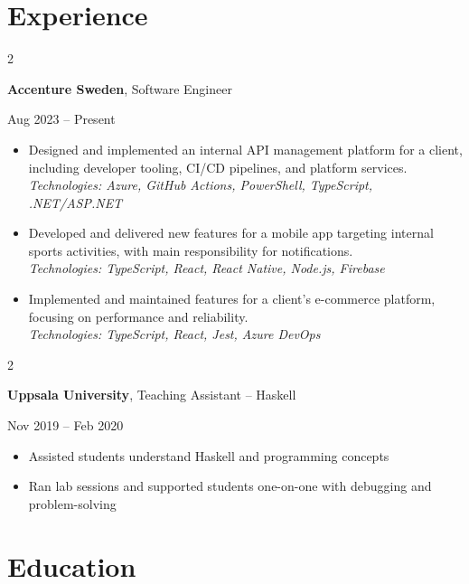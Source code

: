 \documentclass[10pt, letterpaper]{article}
\newenvironment{highlights}{
    \begin{itemize}[
        topsep=0.10 cm,
        parsep=0.10 cm,
        partopsep=0pt,
        itemsep=0pt,
        leftmargin=0.4 cm + 10pt
    ]
}{
    \end{itemize}
} %
\newenvironment{twocolentry}[2][]{
    \onecolentry
    \def\secondColumn{#2}
    \setcolumnwidth{\fill, 4.5 cm}
    \begin{paracol}{2}
}{
    \switchcolumn \raggedleft \secondColumn
    \end{paracol}
    \endonecolentry
} %
\begin{document}
    \section{Experience}
    \begin{twocolentry}{
            Aug 2023 – Present
        }
        \textbf{Accenture Sweden}, Software Engineer
    \end{twocolentry}
    \begin{highlights}
        \item Designed and implemented an internal API management platform for a client, including developer tooling, CI/CD pipelines, and platform services. \\
            \small{\textit{Technologies: Azure, GitHub Actions, PowerShell, TypeScript, .NET/ASP.NET}}
        \item Developed and delivered new features for a mobile app targeting internal sports activities, with main responsibility for notifications. \\
            \small{\textit{Technologies: TypeScript, React, React Native, Node.js, Firebase}}
        \item Implemented and maintained features for a client’s e-commerce platform, focusing on performance and reliability. \\
            \small{\textit{Technologies: TypeScript, React, Jest, Azure DevOps}}
    \end{highlights}
    
    \vspace{0.2 cm}
    
    \begin{twocolentry}{
            Nov 2019 – Feb 2020
        }
        \textbf{Uppsala University}, Teaching Assistant – Haskell
    \end{twocolentry}
        \begin{highlights}
            \item Assisted students understand Haskell and programming concepts
            \item Ran lab sessions and supported students one-on-one with debugging and problem-solving
        \end{highlights}
    
    \section{Education}
    
\end{document}
